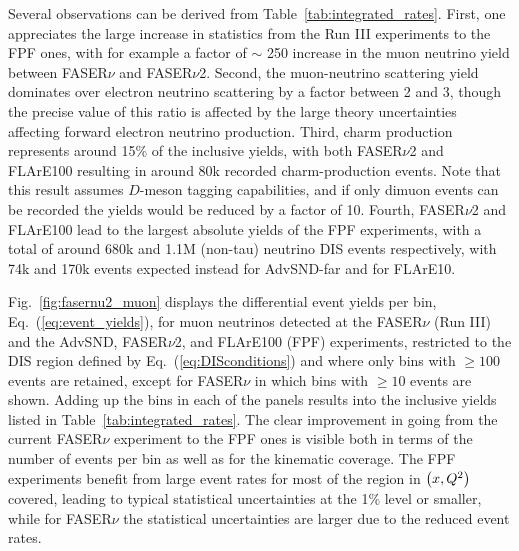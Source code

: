 



Several observations can be derived from Table~\ref{tab:integrated_rates}.
%
First, one appreciates the large increase in statistics from
the Run III experiments to the FPF ones, with for example a factor of
$\sim$ 250 increase in the muon neutrino yield between FASER$\nu$ and
FASER$\nu$2.
%
Second, the muon-neutrino scattering yield dominates over electron neutrino scattering by a factor
between 2 and 3, though the precise value of this ratio is affected by the large theory uncertainties
affecting forward electron neutrino production.
%
Third, charm production  represents around 15\% of the inclusive
yields, with both FASER$\nu$2 and FLArE100 resulting in around
80k recorded charm-production events.
%
Note that this result assumes $D$-meson tagging capabilities,
and if only dimuon events can be recorded
the yields would be reduced by a factor of 10.
%
Fourth, FASER$\nu$2 and FLArE100 lead to the largest absolute
yields of the FPF experiments, with a total of around 680k and 1.1M (non-tau) neutrino DIS events respectively, with 74k and 170k
events expected instead for AdvSND-far and for FLArE10.

 Fig.~\ref{fig:fasernu2_muon} displays the differential
 event yields per bin,  Eq.~(\ref{eq:event_yields}),
 for muon neutrinos detected at the
 FASER$\nu$ (Run III) and the AdvSND, FASER$\nu$2, and FLArE100  (FPF) experiments,
 restricted
 to the DIS region defined by Eq.~(\ref{eq:DISconditions})
 and where only bins with $\ge 100$ events are retained, except for FASER$\nu$ in which bins with $\ge 10$ events are shown.
 Adding up the bins in each of the panels results into the inclusive yields listed in
 Table~\ref{tab:integrated_rates}.
 The clear improvement in going from the current FASER$\nu$ experiment
 to the FPF ones is visible both in terms
 of the number
 of events per bin as well as for the kinematic coverage.
 The FPF experiments benefit from large
 event rates for most of the region in $\left( x,Q^2\right)$ covered,
 leading to typical statistical uncertainties at the 1\% level or smaller,
 while for FASER$\nu$ the statistical uncertainties are larger due
 to the reduced event rates.
  
